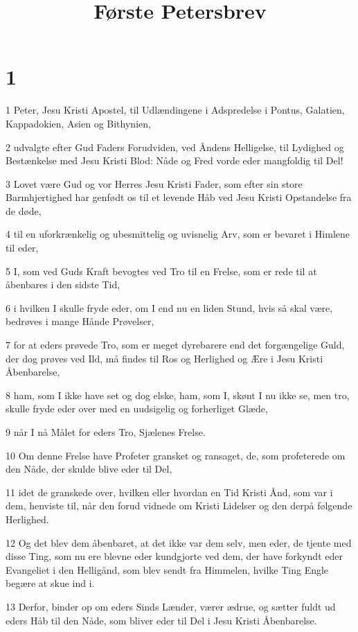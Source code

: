 

\title{Første Petersbrev}


\chapter{1}

\par 1 Peter, Jesu Kristi Apostel, til Udlændingene i Adspredelse i Pontus, Galatien, Kappadokien, Asien og Bithynien,
\par 2 udvalgte efter Gud Faders Forudviden, ved Åndens Helligelse, til Lydighed og Bestænkelse med Jesu Kristi Blod: Nåde og Fred vorde eder mangfoldig til Del!
\par 3 Lovet være Gud og vor Herres Jesu Kristi Fader, som efter sin store Barmhjertighed har genfødt os til et levende Håb ved Jesu Kristi Opstandelse fra de døde,
\par 4 til en uforkrænkelig og ubesmittelig og uvisnelig Arv, som er bevaret i Himlene til eder,
\par 5 I, som ved Guds Kraft bevogtes ved Tro til en Frelse, som er rede til at åbenbares i den sidste Tid,
\par 6 i hvilken I skulle fryde eder, om I end nu en liden Stund, hvis så skal være, bedrøves i mange Hånde Prøvelser,
\par 7 for at eders prøvede Tro, som er meget dyrebarere end det forgængelige Guld, der dog prøves ved Ild, må findes til Ros og Herlighed og Ære i Jesu Kristi Åbenbarelse,
\par 8 ham, som I ikke have set og dog elske, ham, som I, skønt I nu ikke se, men tro, skulle fryde eder over med en uudsigelig og forherliget Glæde,
\par 9 når I nå Målet for eders Tro, Sjælenes Frelse.
\par 10 Om denne Frelse have Profeter gransket og ransaget, de, som profeterede om den Nåde, der skulde blive eder til Del,
\par 11 idet de granskede over, hvilken eller hvordan en Tid Kristi Ånd, som var i dem, henviste til, når den forud vidnede om Kristi Lidelser og den derpå følgende Herlighed.
\par 12 Og det blev dem åbenbaret, at det ikke var dem selv, men eder, de tjente med disse Ting, som nu ere blevne eder kundgjorte ved dem, der have forkyndt eder Evangeliet i den Helligånd, som blev sendt fra Himmelen, hvilke Ting Engle begære at skue ind i.
\par 13 Derfor, binder op om eders Sinds Lænder, værer ædrue, og sætter fuldt ud eders Håb til den Nåde, som bliver eder til Del i Jesu Kristi Åbenbarelse.
